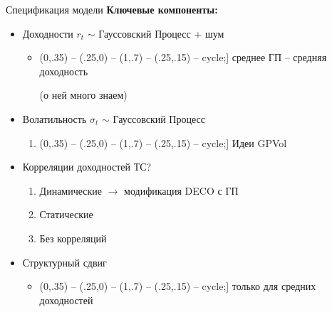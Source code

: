 \documentclass[12pt]{beamer}
\def\checkmarksmall{\tikz\fill[scale=0.5](0,.35) -- (.25,0) -- (1,.7) -- (.25,.15) -- cycle;}
\begin{document}
\begin{frame}{Спецификация модели}
\textbf{Ключевые компоненты:}
\begin{itemize}
	\item Доходности $r_t$ $\sim$ Гауссовский Процесс + шум
	\begin{itemize}
		\item[\checkmarksmall] среднее ГП -- средняя доходность
		
		(о ней много знаем)
	\end{itemize}
	\item<2-> Волатильность $\sigma_t$ $\sim$ Гауссовский Процесс
	\begin{enumerate}
		\item[\checkmarksmall] Идеи GPVol
	\end{enumerate}
	\item<3-> Корреляции доходностей ТС?
	\begin{enumerate}
		\item Динамические $\rightarrow$ модификация DECO с ГП
		\item Статические 
		\item Без корреляций
	\end{enumerate}
	\item<4-> Структурный сдвиг
	\begin{itemize}
		\item[\checkmarksmall] только для средних доходностей
	\end{itemize}
\end{itemize}
\vspace{-.8\baselineskip}
\begin{overlayarea}{\textwidth}{4cm}
\end{overlayarea}
\end{frame}
\end{document}
